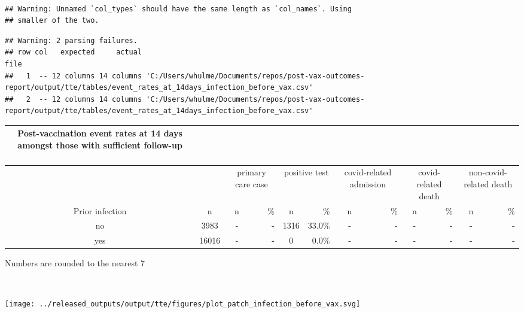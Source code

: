 \documentclass[
]{article}
\begin{document}
~ ~

\begin{verbatim}
## Warning: Unnamed `col_types` should have the same length as `col_names`. Using
## smaller of the two.
\end{verbatim}

\begin{verbatim}
## Warning: 2 parsing failures.
## row col   expected     actual                                                                                                                        file
##   1  -- 12 columns 14 columns 'C:/Users/whulme/Documents/repos/post-vax-outcomes-report/output/tte/tables/event_rates_at_14days_infection_before_vax.csv'
##   2  -- 12 columns 14 columns 'C:/Users/whulme/Documents/repos/post-vax-outcomes-report/output/tte/tables/event_rates_at_14days_infection_before_vax.csv'
\end{verbatim}

\captionsetup[table]{labelformat=empty,skip=1pt}
\begin{longtable}{cccrcrcrcrcr}
\caption*{
\large Post-vaccination event rates at 14 days amongst those with sufficient follow-up\\ 
\small \\ 
} \\ 
\toprule
& & \multicolumn{2}{c}{primary care case} & \multicolumn{2}{c}{positive test} & \multicolumn{2}{c}{covid-related admission} & \multicolumn{2}{c}{covid-related death} & \multicolumn{2}{c}{non-covid-related death} \\ 
 \cmidrule(lr){3-4}\cmidrule(lr){5-6}\cmidrule(lr){7-8}\cmidrule(lr){9-10}\cmidrule(lr){11-12}
Prior infection & n & n & \% & n & \% & n & \% & n & \% & n & \% \\ 
\midrule
no & 3983 & - & - & 1316 & $33.0\%$ & - & - & - & - & - & - \\ 
yes & 16016 & - & - & 0 & $0.0\%$ & - & - & - & - & - & - \\ 
\bottomrule
\end{longtable}
\begin{minipage}{\linewidth}
Numbers are rounded to the nearest 7\\ 
\end{minipage}

~ ~

\texttt{[image: ../released\_outputs/output/tte/figures/plot\_patch\_infection\_before\_vax.svg]}
\end{document}
